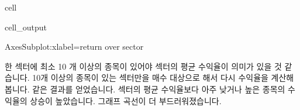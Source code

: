 \documentclass[letterpaper,10pt,english]{jupyterBook}
\begin{document}
\begin{sphinxuseclass}{cell}
\begin{sphinxVerbatimOutput}
\begin{sphinxuseclass}{cell_output}
\begin{sphinxVerbatim}[commandchars=\\\{\}]
\PYGZlt{}AxesSubplot:xlabel=\PYGZsq{}return over sector\PYGZsq{}\PYGZgt{}
\end{sphinxVerbatim}

\noindent{}

\end{sphinxuseclass}\end{sphinxVerbatimOutput}

\end{sphinxuseclass}
\sphinxAtStartPar
한 섹터에 최소 10 개 이상의 종목이 있어야 섹터의 평균 수익율이 의미가 있을 것 같습니다. 10개 이상의 종목이 있는 섹터만을 매수 대상으로 해서 다시 수익율을 계산해봅니다. 같은 결과를 얻었습니다. 섹터의 평균 수익율보다 아주 낮거나 높은 종목의 수익율의 상승이 높았습니다. 그래프 곡선이 더 부드러워졌습니다.
\end{document}

